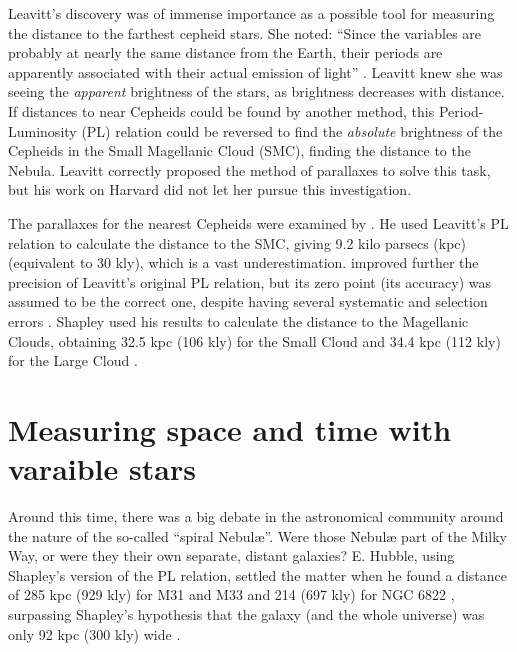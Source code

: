 Leavitt's discovery was of immense importance as a possible tool for measuring the distance to the farthest cepheid stars. 
She noted: \enquote{Since the variables are probably at nearly the same distance from the Earth,
their periods are apparently associated with their actual emission of light} \citep[page 3]{Leavitt1912}.
Leavitt knew she was seeing the \textit{apparent} brightness of the stars, as brightness decreases with distance.
If distances to near Cepheids could be found by another method, 
this Period-Luminosity (PL) relation could be reversed to find the \textit{absolute} brightness of the Cepheids in the Small Magellanic Cloud (SMC),
finding the distance to the Nebula.
Leavitt correctly proposed the method of parallaxes to solve this task, but his work on Harvard did not let her pursue this investigation.


The parallaxes for the nearest Cepheids were examined by \citep{Hertzsprung1913}.
He used Leavitt's PL relation to calculate the distance to the SMC, 
giving \citep[after a \enquote{pen error}, see][]{Fernie1969} 9.2 kilo parsecs (kpc) (equivalent to 30 kly), which is a vast underestimation.
\cite{Shapley1918} improved further the precision of Leavitt's original PL relation, 
but its zero point (its accuracy) was assumed to be the correct one, despite having several systematic and selection errors \citep{Fernie1969}.
Shapley used his results to calculate the distance to the Magellanic Clouds, 
obtaining 32.5 kpc (106 kly) for the Small Cloud \citep{Shapley1924S} and 34.4 kpc (112 kly) for the Large Cloud \citep{Shapley1924L}.

\section{Measuring space and time with varaible stars}


Around this time, there was a big debate in the astronomical community around the nature of the so-called \enquote{spiral Nebul\ae{}}.
Were those Nebul\ae{} part of the Milky Way, or were they their own separate, distant galaxies?
E. Hubble, using Shapley's version of the PL relation, settled the matter when he found a distance of 285 kpc (929 kly) for M31 and M33 
\citep[now called the Andromeda and Triangulum galaxies,][]{Hubble1925a}
and 214 (697 kly) for NGC 6822 \citep[Barnard's galaxy,][]{Hubble1925b}, 
surpassing Shapley's hypothesis that the galaxy (and the whole universe) was only 92 kpc (300 kly) wide \citep{ShapleyCurtis1921}.

